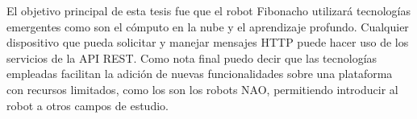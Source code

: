 

El objetivo principal de esta tesis fue 
que el robot Fibonacho
utilizará tecnologías emergentes como son el cómputo en la nube
y el aprendizaje 
profundo.
Cualquier dispositivo que pueda solicitar y
manejar mensajes HTTP puede hacer uso de los servicios
de la API REST.
Como nota final puedo decir que las tecnologías empleadas
facilitan la adición
de nuevas funcionalidades sobre una plataforma con recursos
limitados, como los son los robots NAO,
permitiendo introducir al robot a otros campos de estudio.



